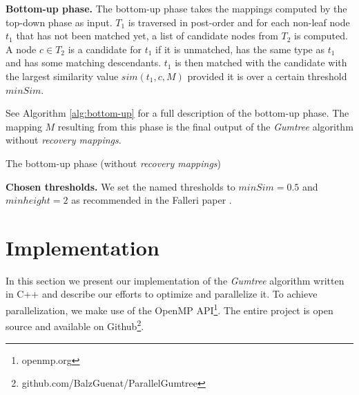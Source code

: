 \documentclass[letterpaper]{article}
\newcommand{\mypar}[1]{{\bf #1.}}
\begin{document}
\mypar{Bottom-up phase}
The bottom-up phase takes the mappings computed by the top-down phase as input.
$T_1$ is traversed in post-order and for each non-leaf node $t_1$ that has not been matched yet, a list of candidate nodes from $T_2$ is computed.
A node $c \in T_2$ is a candidate for $t_1$ if it is unmatched, has the same type as $t_1$ and has some matching descendants.
$t_1$ is then matched with the candidate with the largest similarity value $sim(t_1,c,M)$ provided it is over a certain threshold $minSim$.

See Algorithm \ref{alg:bottom-up} for a full description of the bottom-up phase.
The mapping $M$ resulting from this phase is the final output of the \emph{Gumtree} algorithm without \emph{recovery mappings}.

\begin{algorithm}
\caption{The bottom-up phase (without \emph{recovery mappings})}
\label{alg:bottom-up}
\end{algorithm}

\mypar{Chosen thresholds}
We set the named thresholds to $minSim=0.5$ and $minheight=2$ as recommended in the Falleri paper \cite{falleri:2014:structure_diff}.

\section{Implementation}\label{sec:yourmethod}

In this section we present our implementation of the \emph{Gumtree} algorithm written in C++ and describe our efforts to optimize and parallelize it.
To achieve parallelization, we make use of the OpenMP API\footnote{openmp.org}.
The entire project is open source and available on Github\footnote{github.com/BalzGuenat/ParallelGumtree}.
\end{document}
